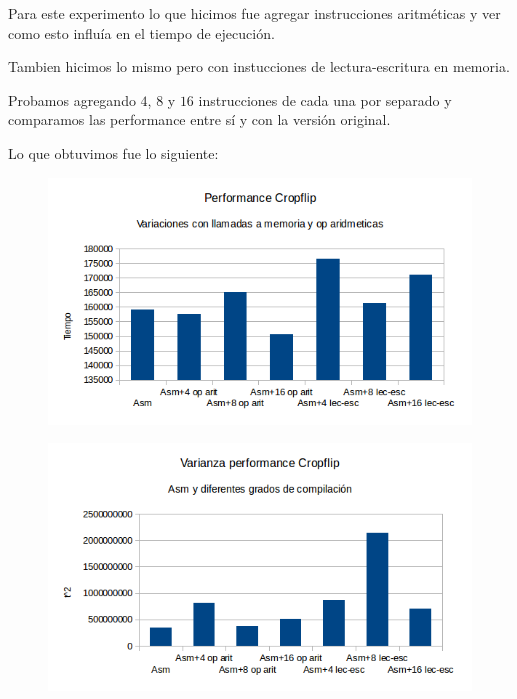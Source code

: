 \documentclass[a4paper]{article}
\begin{document}
Para este experimento lo que hicimos fue agregar instrucciones aritméticas y ver como esto influía en el tiempo de ejecución.

Tambien hicimos lo mismo pero con instucciones de lectura-escritura en memoria. 

Probamos agregando $4$, $8$ y $16$ instrucciones de cada una por separado y comparamos las performance entre sí y con la versión original.

Lo que obtuvimos fue lo siguiente:

\begin{figure}[h!]
  \begin{center}
  \includegraphics[scale=0.66]{Graficos1.5/crop/per.png}
  \label{nombreparareferenciar1}
  \end{center}
\end{figure}

\begin{figure}[h!]
  \begin{center}
  \includegraphics[scale=0.66]{Graficos1.5/crop/var.png}
  \label{nombreparareferenciar1}
  \end{center}
\end{figure}
\end{document}
